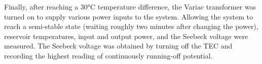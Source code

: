 \begin{paper}

	Finally, after reaching a \( 30 \si{\celsius} \) temperature difference, the Variac transformer was turned on to supply various power inputs to the system. Allowing the system to reach a semi-stable state (waiting roughly two minutes after changing the power), reservoir temperatures, input and output power, and the Seebeck voltage were measured. The Seebeck voltage was obtained by turning off the TEC and recording the highest reading of continuously running-off potential. 


\end{paper}
